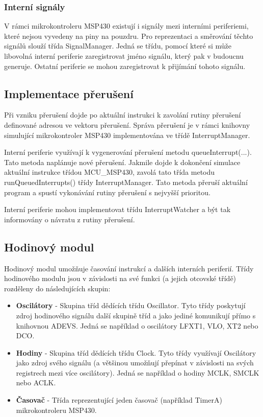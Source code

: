 \subsubsection{Interní signály}

V rámci mikrokontroleru MSP430 existují i signály mezi interními periferiemi, které nejsou vyvedeny na piny na pouzdru. Pro reprezentaci a směrování těchto signálů slouží třída SignalManager. Jedná se třídu, pomocí které si může libovolná interní periferie zaregistrovat jméno signálu, který pak v budoucnu generuje. Ostatní periferie se mohou zaregistrovat k přijímání tohoto signálu.

\subsection{Implementace přerušení}

Při vzniku přerušení dojde po aktuální instrukci k zavolání rutiny přerušení definované adresou ve vektoru přerušení. Správa přerušení je v rámci knihovny simulující mikrokontroler MSP430 implementována ve třídě InterruptManager.

Interní periferie využívají k vygenerování přerušení metodu queueInterrupt(...). Tato metoda naplánuje nové přerušení. Jakmile dojde k dokončení simulace aktuální instrukce třídou MCU\_MSP430, zavolá tato třída metodu runQueuedInterrupts() třídy InterruptManager. Tato metoda přeruší aktuální program a spustí vykonávání rutiny přerušení s nejvyšší prioritou.

Interní periferie mohou implementovat třídu InterruptWatcher a být tak informovány o návratu z rutiny přerušení.

\subsection{Hodinový modul}

Hodinový modul umožňuje časování instrukcí a dalších interních periferií. Třídy hodinového modulu jsou v závislosti na své funkci (a jejich otcovské třídě) rozděleny do následujících skupin:

\begin{itemize}
\item \textbf{Oscilátory} - Skupina tříd dědících třídu Oscillator. Tyto třídy poskytují zdroj hodinového signálu další skupině tříd a jako jediné komunikují přímo s knihovnou ADEVS. Jedná se například o oscilátory LFXT1, VLO, XT2 nebo DCO.
\item \textbf{Hodiny} - Skupina tříd dědících třídu Clock. Tyto třídy využívají Oscilátory jako zdroj svého signálu (a většinou umožňují přepínat v závislosti na svých registrech mezi více oscilátory). Jedná se například o hodiny MCLK, SMCLK nebo ACLK.
\item \textbf{Časovač} - Třída reprezentující jeden časovač (například TimerA)  mikrokontroleru MSP430.
\end{itemize}

